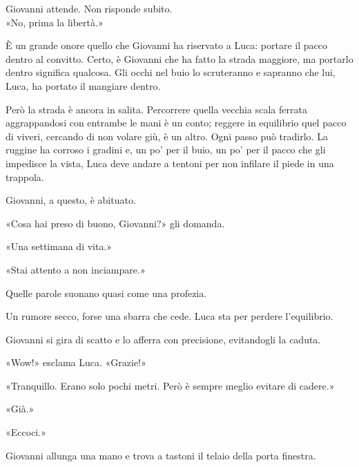 \par\medskip
Giovanni attende. Non risponde subito.\\
«No, prima la libertà.»

\par\medskip
\`E un grande onore quello che Giovanni ha riservato a Luca: portare il pacco dentro al convitto. Certo, \`e Giovanni che ha fatto la strada maggiore, ma portarlo dentro significa qualcosa. Gli occhi nel buio lo scruteranno e sapranno che lui, Luca, ha portato il mangiare dentro.

\par\medskip
Però la strada \`e ancora in salita. Percorrere quella vecchia scala ferrata aggrappandosi con entrambe le mani \`e un conto; reggere in equilibrio quel pacco di viveri, cercando di non volare giù, \`e un altro. Ogni passo pu\`o tradirlo. La ruggine ha corroso i gradini e, un po’ per il buio, un po’ per il pacco che gli impedisce la vista, Luca deve andare a tentoni per non infilare il piede in una trappola.

\par\medskip
Giovanni, a questo, \`e abituato.

\par\medskip
«Cosa hai preso di buono, Giovanni?» gli domanda.

\par\medskip
«Una settimana di vita.»

\par\medskip
«Stai attento a non inciampare.»

\par\medskip
Quelle parole suonano quasi come una profezia.

\par\medskip
Un rumore secco, forse una sbarra che cede. Luca sta per perdere l’equilibrio.

\par\medskip
Giovanni si gira di scatto e lo afferra con precisione, evitandogli la caduta.

\par\medskip
«Wow!» esclama Luca. «Grazie!»

\par\medskip
«Tranquillo. Erano solo pochi metri. Però \`e sempre meglio evitare di cadere.»

\par\medskip
«Già.»

\par\medskip
«Eccoci.»

\par\medskip
Giovanni allunga una mano e trova a tastoni il telaio della porta finestra.

